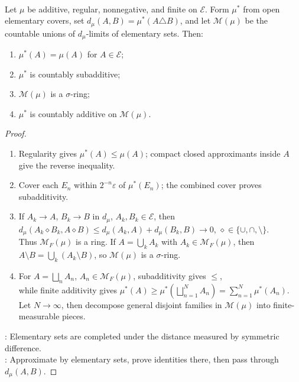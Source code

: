 \begin{theorem} \label{thm:measure-measurability-main-source-todo}\label{thm:rudin-measure-extension} \\
Let $\mu$ be additive, regular, nonnegative, and finite on $\mathcal{E}$. Form $\mu^\ast$ from open elementary covers, set $d_\mu(A,B)=\mu^\ast(A\triangle B)$, and let $\mathcal{M}(\mu)$ be the countable unions of $d_\mu$-limits of elementary sets. Then:
\begin{enumerate}[label=(\roman*)]
\setlength{\itemsep}{0pt}
\item $\mu^\ast(A)=\mu(A)$ for $A\in\mathcal{E}$;
\item $\mu^\ast$ is countably subadditive;
\item $\mathcal{M}(\mu)$ is a $\sigma$-ring;
\item $\mu^\ast$ is countably additive on $\mathcal{M}(\mu)$.
\end{enumerate}
\begin{proof}
\begin{enumerate}[label=(\roman*)]
\setlength{\itemsep}{0pt}
\item Regularity gives $\mu^\ast(A)\leq\mu(A)$; compact closed approximants inside $A$ give the reverse inequality.
\item Cover each $E_n$ within $2^{-n}\varepsilon$ of $\mu^\ast(E_n)$; the combined cover proves subadditivity.
\item If $A_k\to A$, $B_k\to B$ in $d_\mu$, $A_k,B_k\in\mathcal{E}$, then $d_\mu(A_k\diamond B_k,A\diamond B)\leq d_\mu(A_k,A)+d_\mu(B_k,B)\to0$, $\diamond\in\{\cup,\cap,\setminus\}$.\\
Thus $\mathcal{M}_F(\mu)$ is a ring. If $A=\bigcup_kA_k$ with $A_k\in\mathcal{M}_F(\mu)$, then $A\setminus B=\bigcup_k(A_k\setminus B)$, so $\mathcal{M}(\mu)$ is a $\sigma$-ring.
\item For $A=\bigsqcup\limits_n A_n$, $A_n\in\mathcal{M}_F(\mu)$, subadditivity gives $\leq$,\\
while finite additivity gives $\mu^\ast(A)\geq\mu^\ast\left(\bigsqcup\limits_{n=1}^{N}A_n\right)=\sum\limits_{n=1}^{N}\mu^\ast(A_n)$.\\
Let $N\to\infty$, then decompose general disjoint families in $\mathcal{M}(\mu)$ into finite-measurable pieces.
\end{enumerate}
: Elementary sets are completed under the distance measured by symmetric difference.\\
: Approximate by elementary sets, prove identities there, then pass through $d_\mu(A,B)$.
\end{proof}
\end{theorem}

